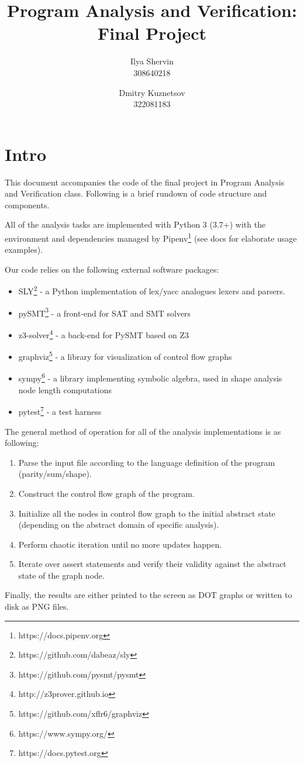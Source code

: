 \documentclass[12pt,a4paper]{article}
\title{Program Analysis and Verification:\\Final Project}
\author{Ilya Shervin\\ 308640218 
        \and
        Dmitry Kuznetsov\\ 322081183}
\begin{document}
\maketitle
	\section*{Intro}
	This document accompanies the code of the final project in Program Analysis and Verification class. Following is a brief rundown of code structure and components.
	
	All of the analysis tasks are implemented with Python 3 (3.7+) with the environment and dependencies managed by Pipenv\footnote{https://docs.pipenv.org} (see docs for elaborate usage examples).
	
	Our code relies on the following external software packages:
	\begin{itemize}
		\item SLY\footnote{https://github.com/dabeaz/sly} - a Python implementation of lex/yacc analogues lexers and parsers.
		\item pySMT\footnote{https://github.com/pysmt/pysmt} - a front-end for SAT and SMT solvers
		\item z3-solver\footnote{http://z3prover.github.io} - a back-end for PySMT based on Z3
		\item graphviz\footnote{https://github.com/xflr6/graphviz} - a library for visualization of control flow graphs
		\item sympy\footnote{https://www.sympy.org/} - a library implementing symbolic algebra, used in shape analysis node length computations
		\item pytest\footnote{https://docs.pytest.org} - a test harness
	\end{itemize}
The general method of operation for all of the analysis implementations is as following:
\begin{enumerate}
	\item Parse the input file according to the language definition of the program (parity/sum/shape).
	\item Construct the control flow graph of the program.
	\item Initialize all the nodes in control flow graph to the initial abstract state (depending on the abstract domain of specific analysis).
	\item Perform chaotic iteration until no more updates happen.
	\item Iterate over assert statements and verify their validity against the abstract state of the graph node.
\end{enumerate}
Finally, the results are either printed to the screen as DOT graphs or written to disk as PNG files.
\end{document}
